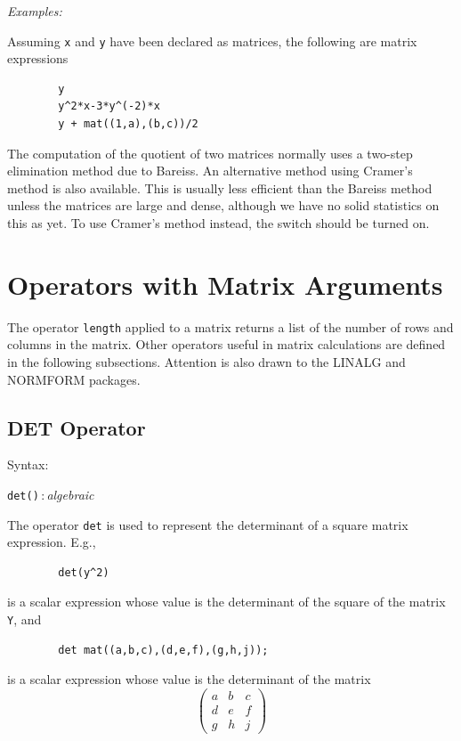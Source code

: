 \textit{Examples:}

Assuming \texttt{x} and \texttt{y} have been declared as matrices, the following
are matrix expressions
\begin{verbatim}
        y
        y^2*x-3*y^(-2)*x
        y + mat((1,a),(b,c))/2
\end{verbatim}
\hypertarget{switch:CRAMER}{}
The computation of the quotient of two matrices normally uses a two-step
elimination method due to Bareiss.  An alternative method using Cramer's
method is also available.  This is usually less efficient than the Bareiss
method unless the matrices are large and dense, although we have no solid
statistics on this as yet.  To use Cramer's method instead, the switch
 should be turned on.


\section{Operators with Matrix Arguments}
\label{sec:core-matrix-operators}

The operator \texttt{length} applied to a matrix returns a
list of the number of rows and columns in the matrix.  Other operators
useful in matrix calculations are defined in the following subsections.
Attention is also drawn to the LINALG
 and NORMFORM
 packages.

\subsection{DET Operator}
\hypertarget{operator:DET}{}
Syntax:
\begin{syntax}
  \texttt{det(}\texttt{)}\,:\,\textit{algebraic}
\end{syntax}

The operator \texttt{det} is used to represent the determinant of a square
matrix expression.  E.g.,
\begin{verbatim}
        det(y^2)
\end{verbatim}
is a scalar expression whose value is the determinant of the square of the
matrix \texttt{Y}, and
\begin{verbatim}
        det mat((a,b,c),(d,e,f),(g,h,j));
\end{verbatim}
is a scalar expression whose value is the determinant of the matrix
\[ \left( \begin{array}{lcr} a & b & c \\ d & e & f \\ g & h & j
\end{array} \right) \]

